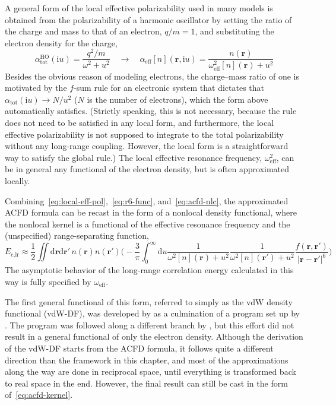 A general form of the local effective polarizability used in many models is obtained from the polarizability of a harmonic oscillator by setting the ratio of the charge and mass to that of an electron, $q/m=1$, and substituting the electron density for the charge,
\begin{equation}
  \alpha_\text{tot}^\text{HO}(\mathrm iu)=\frac{q^2/m}{\omega^2+u^2}
  \quad\longrightarrow\quad
  \alpha_\text{eff}[n](\mathbf r,\mathrm iu)=\frac{n(\mathbf r)}{\omega^2_\text{eff}[n](\mathbf r)+u^2}
  \label{eq:local-eff-pol}
\end{equation}
Besides the obvious reason of modeling electrons, the charge--mass ratio of one is motivated by the $f$-sum rule for an electronic system that dictates that $\alpha_\text{tot}(\mathrm iu)\rightarrow N/u^2$ ($N$ is the number of electrons), which the form above automatically satisfies.
(Strictly speaking, this is not necessary, because the rule does not need to be satisfied in any local form, and furthermore, the local effective polarizability is not supposed to integrate to the total polarizability without any long-range coupling.
However, the local form is a straightforward way to satisfy the global rule.)
The local effective resonance frequency, $\omega^2_\text{eff}$, can be in general any functional of the electron density, but is often approximated locally.

Combining~\eqref{eq:local-eff-pol},~\eqref{eq:r6-func}, and~\eqref{eq:acfd-nlc}, the approximated ACFD formula can be recast in the form of a nonlocal density functional, where the nonlocal kernel is a functional of the effective resonance frequency and the (unspecified) range-separating function,
\begin{equation}
  E_\text{c,lr}\approx
  \frac12\iint\mathrm d\mathbf r\mathrm d\mathbf r'\,n(\mathbf r)n(\mathbf r')\bigg(-\frac3{\pi}\int_0^\infty\mathrm du\frac1{\omega^2[n](\mathbf r)+u^2}\frac1{\omega^2[n](\mathbf r')+u^2}\frac{f(\mathbf r,\mathbf r')}{|\mathbf r-\mathbf r'|^6}\bigg)
  \label{eq:acfd-kernel}
\end{equation}
The asymptotic behavior of the long-range correlation energy calculated in this way is fully specified by $\omega_\text{eff}$.

The first general functional of this form, referred to simply as the vdW density functional (vdW-DF), was developed by \citet{DionPRL04} as a culmination of a program set up by \citet*{AnderssonPRL96}.
The program was followed along a different branch by \citet{HultPRL96,HultPRB99}, but this effort did not result in a general functional of only the electron density.
Although the derivation of the vdW-DF starts from the ACFD formula, it follows quite a different direction than the framework in this chapter, and most of the approximations along the way are done in reciprocal space, until everything is transformed back to real space in the end.
However, the final result can still be cast in the form of~\eqref{eq:acfd-kernel}.


